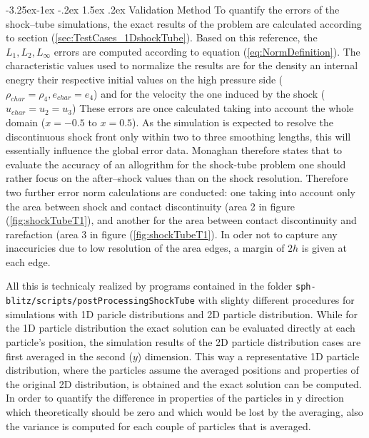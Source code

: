 \documentclass{report}
\makeatletter
\renewcommand\paragraph{\@startsection{paragraph}{4}{\z@}%
  {-3.25ex\@plus -1ex \@minus -.2ex}%
  {1.5ex \@plus .2ex}%
  {\normalfont\normalsize\bfseries}}
\makeatother
\begin{document}
\paragraph{Validation Method}
To quantify the errors of the shock--tube simulations, the exact results of the problem are calculated according to section (\ref{sec:TestCases_1DshockTube}). Based on this reference, the $L_1, L_2,L_{\infty}$ errors are computed according to equation (\ref{eq:NormDefinition}).
The characteristic values used to normalize the results are for the density an internal enegry their respective initial values on the high pressure side ($\rho_{\mathit{char}}=\rho_4, e_{\mathit{char}}=e_4$) and for the velocity the one induced by the shock ($u_{\mathit{char}}=u_2=u_3$)
These errors are once calculated taking into account the whole domain ($x=-0.5$ to $x=0.5$). 
As the simulation is expected to resolve the discontinuous shock front only within two to three smoothing lengths, this will essentially influence the global error data. Monaghan \cite{Monaghan2005} therefore states that to evaluate the accuracy of an allogrithm for the shock-tube problem one should rather focus on the after--shock values than on the shock resolution. Therefore two further error norm calculations are conducted: one taking into account only the area between shock and contact discontinuity (area 2 in figure (\ref{fig:shockTubeT1}), and another for the area between contact discontinuity and rarefaction (area 3 in figure (\ref{fig:shockTubeT1}). In oder not to capture any inaccuricies due to low resolution of the area edges, a margin of $2h$ is given at each edge.

All this is technicaly realized by programs contained in the folder {\tt sph-blitz/scripts/postProcessingShockTube} with slighty different procedures for simulations with 1D paricle distributions and 2D particle distribution. While for the 1D particle distribution the exact solution can be evaluated directly at each particle's position, the simulation results of the 2D particle distribution cases are first averaged in the second ($y$) dimension. This way a representative 1D particle distribution, where the particles assume the averaged positions and properties of the original 2D distribution, is obtained and the exact solution can be computed. In order to quantify the difference in properties of the particles in y direction which theoretically should be zero and which would be lost by the averaging, also the variance is computed for each couple of particles that is averaged.
\end{document}
